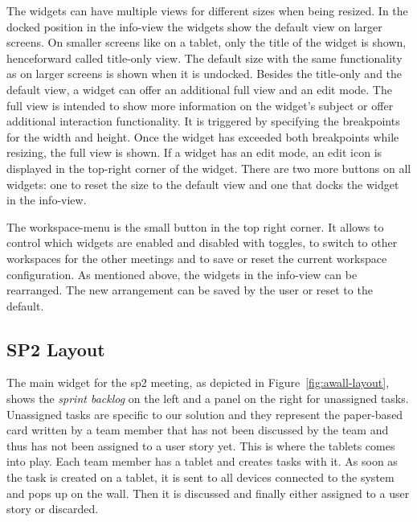 \documentclass{sigchi}
\begin{document}
The widgets can have multiple views for different sizes when being resized.
In the docked position in the info-view the widgets show the default view on larger screens. 
On smaller screens like on a tablet, only the title of the widget is shown, henceforward called title-only view.
The default size with the same functionality as on larger screens is shown when it is undocked.
Besides the title-only and the default view, a widget can offer an additional full view and an edit mode.
The full view is intended to show more information on the widget's subject or offer additional interaction functionality.
It is triggered by specifying the breakpoints for the width and height.
Once the widget has exceeded both breakpoints while resizing, the full view is shown.
If a widget has an edit mode, an edit icon is displayed in the top-right corner of the widget.
There are two more buttons on all widgets: one to reset the size to the default view and one that docks the widget in the info-view.


The workspace-menu is the small button in the top right corner.
It allows to control which widgets are enabled and disabled with toggles, to switch to other workspaces for the other meetings and to save or reset the current workspace configuration.
As mentioned above, the widgets in the info-view can be rearranged.
The new arrangement can be saved by the user or reset to the default.



\subsection{SP2 Layout}
The main widget for the \gls{sp2} meeting, as depicted in Figure~\ref{fig:awall-layout}, shows the \textit{sprint backlog} on the left and a panel on the right for unassigned tasks.
Unassigned tasks are specific to our solution and they represent the paper-based card written by a team member that has not been discussed by the team and thus has not been assigned to a user story yet.
This is where the tablets comes into play.
Each team member has a tablet and creates tasks with it.
As soon as the task is created on a tablet, it is sent to all devices connected to the system and pops up on the wall.
Then it is discussed and finally either assigned to a user story or discarded.
\end{document}
